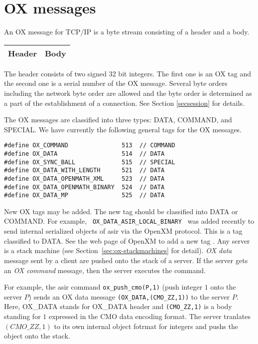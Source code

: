 
\section{OX messages}

An OX message for TCP/IP is a byte stream consisting of
a header and a body.
\begin{center}
\begin{tabular}{|c|c|}
\hline
Header	& \hspace{10mm} Body \hspace{10mm} \\
\hline
\end{tabular}
\end{center}
The header consists of two signed 32 bit integers.
The first one is an OX tag 
and the second one is a serial number of the OX message.
Several byte orders including the network byte order
are allowed and the byte order is determined as a part of
the establishment of a connection. See Section \ref{secsession} for details.

The OX messages are classified into three types:
DATA, COMMAND, and SPECIAL.
We have currently the following general tags for the OX messages.
\begin{verbatim}
#define	OX_COMMAND               513  // COMMAND
#define	OX_DATA	                 514  // DATA
#define OX_SYNC_BALL             515  // SPECIAL
#define OX_DATA_WITH_LENGTH      521  // DATA
#define OX_DATA_OPENMATH_XML     523  // DATA
#define OX_DATA_OPENMATH_BINARY  524  // DATA
#define OX_DATA_MP               525  // DATA
\end{verbatim}

New OX tags may be added.
The new tag should be classified into DATA or COMMAND.
For example, \verb+ OX_DATA_ASIR_LOCAL_BINARY +  was added recently
to send internal serialized objects of asir via the OpenXM protocol.
This is a tag classified to DATA.
See the web page of OpenXM to add a new tag \cite{openxm-web}.
Any server is a stack machine (see Section~\ref{sec:ox-stackmachines}
for detail).
{\it OX data} message sent by a client
are pushed onto the stack of a server. 
If the server gets an {\it OX command} message, then the server 
executes the command.

For example, the asir command {\tt ox\_push\_cmo(P,1)}
(push integer $1$ onto the server $P$)
sends an OX data message
{\tt (OX\_DATA,(CMO\_ZZ,1))} to the server $P$.
Here,
OX\_DATA stands for OX\_DATA header and 
{\tt (CMO\_ZZ,1)} is a body standing for $1$ expressed 
in the CMO data encoding format.
The server tranlates $(CMO\_ZZ, 1)$ to its own internal object fotrmat
for integers and pushs the object onto the stack.

%
